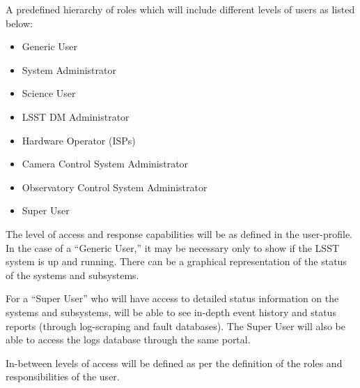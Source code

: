 A predefined hierarchy of roles which will include different levels of users as
listed below:

\begin{itemize}

\item Generic User
\item System Administrator
\item Science User
\item LSST DM Administrator
\item Hardware Operator (ISPs)
\item Camera Control System Administrator
\item Observatory Control System Administrator
\item Super User

\end{itemize}

The level of access and response capabilities will be as defined in the
user-profile. In the case of a ``Generic User,'' it may be necessary only to show
if the LSST system is up and running. There can be a graphical representation of
the status of the systems and subsystems.

For a ``Super User'' who will have access to detailed status information on the
systems and subsystems, will be able to see in-depth event history and status
reports (through log-scraping and fault databases). The Super User will also be
able to access the logs database through the same portal.

In-between levels of access will be defined as per the definition of the roles
and responsibilities of the user.
